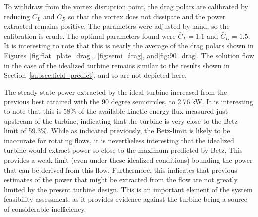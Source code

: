To withdraw from the vortex disruption point, the drag
polars are calibrated by reducing $\bar C_L $ and $\bar C_D$ so that the 
vortex does not dissipate and the power extracted remains positive. The
parameters were adjusted by hand, so the calibration is crude. The
optimal parameters found were $\bar C_L = 1.1$ and $\bar C_D = 1.5$. It
is interesting to note that this is nearly the average of the drag
polars shown in Figures~\ref{fig:flat_plate_drag},~\ref{fig:semi_drag}, 
and\ref{fig:90_drag}. The solution flow in the case of the idealized
turbine remains similar to the results shown in
Section~\ref{subsec:field_predict}, and so are not depicted here. 

The steady state power extracted by the ideal turbine 
increased from the previous best attained with the 90 degree
semicircles, to 2.76 kW. It is interesting to note that this is 58\% of
the available kinetic energy flux measured just upstream of the turbine,
indicating that the turbine is very close to the Betz-limit of
59.3\%. While as indicated previously, the Betz-limit is likely to be
inaccurate for rotating flows, it is nevertheless interesting that the
idealized turbine would extract power so close to the maximum predicted by
Betz.  This provides a weak limit (even under these idealized
conditions) bounding the power that can be derived from this
flow. Furthermore, this indicates that previous estimates of the power
that might be extracted from the flow are not greatly limited by the
present turbine design. This is an important element of the system
feasibility assessment, as it provides evidence against the turbine
being a source of considerable inefficiency.  


